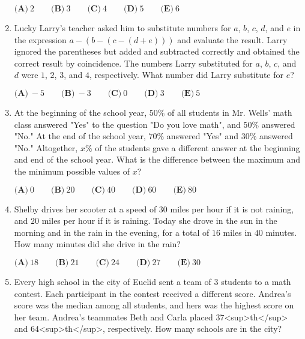 \documentclass{article}
\begin{document}
\begin{enumerate}[label=\arabic*., itemsep=0.5em]
$\textbf{(A)}\ 2 \qquad \textbf{(B)}\ 3 \qquad \textbf{(C)}\ 4 \qquad \textbf{(D)}\ 5 \qquad \textbf{(E)}\ 6$\par \vspace{0.5em}\item Lucky Larry's teacher asked him to substitute numbers for $a$, $b$, $c$, $d$, and $e$ in the expression $a-(b-(c-(d+e)))$ and evaluate the result. Larry ignored the parentheses but added and subtracted correctly and obtained the correct result by coincidence. The numbers Larry substituted for $a$, $b$, $c$, and $d$ were $1$, $2$, $3$, and $4$, respectively. What number did Larry substitute for $e$?

$\textbf{(A)}\ -5 \qquad \textbf{(B)}\ -3 \qquad \textbf{(C)}\ 0 \qquad \textbf{(D)}\ 3 \qquad \textbf{(E)}\ 5$\par \vspace{0.5em}\item At the beginning of the school year, $50\%$ of all students in Mr. Wells' math class answered "Yes" to the question "Do you love math", and $50\%$ answered "No." At the end of the school year, $70\%$ answered "Yes" and $30\%$ answered "No." Altogether, $x\%$ of the students gave a different answer at the beginning and end of the school year. What is the difference between the maximum and the minimum possible values of $x$?

$\textbf{(A)}\ 0 \qquad \textbf{(B)}\ 20 \qquad \textbf{(C)}\ 40 \qquad \textbf{(D)}\ 60 \qquad \textbf{(E)}\ 80$\par \vspace{0.5em}\item Shelby drives her scooter at a speed of $30$ miles per hour if it is not raining, and $20$ miles per hour if it is raining. Today she drove in the sun in the morning and in the rain in the evening, for a total of $16$ miles in $40$ minutes. How many minutes did she drive in the rain?

$\textbf{(A)}\ 18 \qquad \textbf{(B)}\ 21 \qquad \textbf{(C)}\ 24 \qquad \textbf{(D)}\ 27 \qquad \textbf{(E)}\ 30$\par \vspace{0.5em}\item Every high school in the city of Euclid sent a team of $3$ students to a math contest. Each participant in the contest received a different score. Andrea's score was the median among all students, and hers was the highest score on her team. Andrea's teammates Beth and Carla placed $37$<sup>th</sup> and $64$<sup>th</sup>, respectively. How many schools are in the city?


\end{enumerate}
\end{document}
